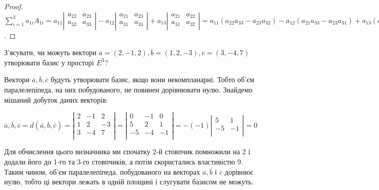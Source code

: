 \begin{proof}
	$\sum\limits_{i=1}^3 a_{1i}A_{1i}
	= a_{11}\left|\begin{matrix}
		a_{22} & a_{23} \\
		a_{32} & a_{33} \\
	\end{matrix} \right|
	- a_{12}\left|\begin{matrix}
		a_{21} & a_{23} \\
		a_{31} & a_{33} \\
	\end{matrix} \right|
	+ a_{13}\left|\begin{matrix}
		a_{21} & a_{22} \\
		a_{31} & a_{32} \\
	\end{matrix} \right|
	= a_{11}(a_{22}a_{33} - a_{23}a_{32})
	- a_{12}(a_{21}a_{33} - a_{23}a_{31})
	+ a_{13}(a_{21}a_{32} - a_{22}a_{31})
	= a_{11}a_{22}a_{33} - a_{11}a_{23}a_{32} - a_{12}a_{21}a_{33}
	+ a_{12}a_{23}a_{31} + a_{13}a_{21}a_{32} - a_{11}a_{22}a_{31}
	= \det A$.
\end{proof}

\begin{problem}
	З’ясувати, чи можуть вектори $\overline{a} = (2, -1, 2), \overline{b} = (1, 2, -3), \overline{c} = (3, -4, 7)$ утворювати базис у просторі $E^3$?
\end{problem}
\begin{solution}
	Вектори $\overline{a}, \overline{b}, \overline{c}$ будуть утворювати базис, якщо вони
	некомпланарні. Тобто об’єм паралелепіпеда, на них побудованого, не повинен
	дорівнювати нулю. Знайдемо мішаний добуток даних векторів:

	$\overline{a}, \overline{b}, \overline{c}
	= d(\overline{a}, \overline{b}, \overline{c})
	= \left|\begin{matrix}
		2  & -1  &  2  \\
		1  &  2  & -3  \\
		3  & -4  &  7  \\
	\end{matrix}\right|
	= \left|\begin{matrix}
		0  & -1  &  0  \\
		5  &  2  &  1  \\
		-5 & -4  & -1  \\
	\end{matrix}\right|
	=-(-1)\left|\begin{matrix}
		5  &  1  \\
		-5 & -1  \\
	\end{matrix}\right|
	= 0$
	
	Для обчислення цього визначника ми спочатку 2-й
	стовпчик помножили на 2 і
	додали його до 1-го та 3-го стовпчиків, а потім скористались властивістю 9. Таким
	чином, об’єм паралелепіпеда, побудованого на векторах $\overline{a}, \overline{b}$ і $\overline{c}$ дорівнює нулю,
	тобто ці вектори лежать в одній площині і слугувати базисом не можуть.
\end{solution}

